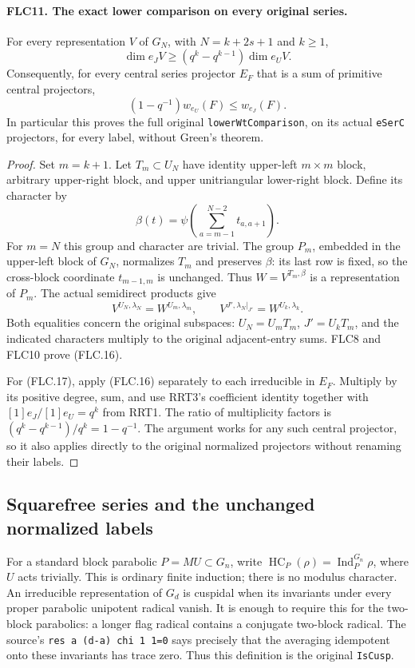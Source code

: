 \paragraph{FLC11. The exact lower comparison on every original series.}
\label{claim:FLC11}
For every representation $V$ of $G_N$, with $N=k+2s+1$ and
$k\ge1$,
\[
 \dim e_JV\ge(q^k-q^{k-1})\dim e_UV.
 \tag{FLC.16}
\]
Consequently, for every central series projector $E_F$ that
is a sum of primitive central projectors,
\[
           (1-q^{-1})w_{e_U}(F)\le w_{e_J}(F).
 \tag{FLC.17}
\]
In particular this proves the full original
\texttt{lowerWtComparison}, on its actual \texttt{eSerC}
projectors, for every label, without Green's theorem.
\begin{proof}
Set $m=k+1$.  Let $T_m\subset U_N$ have identity upper-left
$m\times m$ block, arbitrary upper-right block, and upper
unitriangular lower-right block.  Define its character by
\[
 \beta(t)=\psi\left(\sum_{a=m-1}^{N-2}t_{a,a+1}\right).
\]
For $m=N$ this group and character are trivial.
The group $P_m$, embedded in the upper-left block of $G_N$,
normalizes $T_m$ and preserves $\beta$: its last row is fixed,
so the cross-block coordinate $t_{m-1,m}$ is unchanged.
Thus $W=V^{T_m,\beta}$ is a representation of $P_m$.
The actual semidirect products give
\[
 V^{U_N,\lambda_N}=W^{U_m,\lambda_m},\qquad
 V^{J',\lambda_N|_{J'}}=W^{U_k,\lambda_k}.
\]
Both equalities concern the original subspaces: $U_N=U_mT_m$,
$J'=U_kT_m$, and the indicated characters multiply to the
original adjacent-entry sums.  FLC8 and FLC10 prove (FLC.16).

For (FLC.17), apply (FLC.16) separately to each irreducible
in $E_F$.  Multiply by its positive degree, sum, and use RRT3's
coefficient identity together with
$[1]e_J/[1]e_U=q^k$ from RRT1.  The ratio of multiplicity
factors is $(q^k-q^{k-1})/q^k=1-q^{-1}$.
The argument works for any such central projector, so it
also applies directly to the original normalized projectors
without renaming their labels.
\end{proof}

\subsection{Squarefree series and the unchanged normalized labels}

For a standard block parabolic $P=MU\subset G_n$, write
$\operatorname{HC}_P(\rho)=\operatorname{Ind}_P^{G_n}\rho$,
where $U$ acts trivially.  This is ordinary finite induction;
there is no modulus character.  An irreducible representation
of $G_d$ is cuspidal when its invariants under every proper
parabolic unipotent radical vanish.  It is enough to require
this for the two-block parabolics: a longer flag radical
contains a conjugate two-block radical.  The source's
\texttt{res a (d-a) chi 1 1=0} says precisely that the
averaging idempotent onto these invariants has trace zero.
Thus this definition is the original \texttt{IsCusp}.

